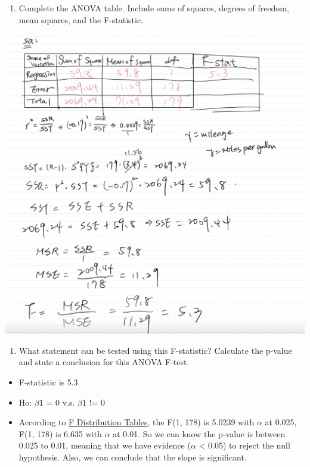 \documentclass[
]{article}
\providecommand{\tightlist}{%
  \setlength{\itemsep}{0pt}\setlength{\parskip}{0pt}}
\begin{document}
\begin{enumerate}
\def\labelenumi{(\alph{enumi})}
\tightlist
\item
  Complete the ANOVA table. Include sums of squares, degrees of freedom,
  mean squares, and the F-statistic.
\end{enumerate}

\includegraphics{pics/Screen Shot 2021-02-21 at 4.24.38 PM.png}

\begin{enumerate}
\def\labelenumi{(\alph{enumi})}
\setcounter{enumi}{1}
\tightlist
\item
  What statement can be tested using this F-statistic? Calculate the
  p-value and state a conclusion for this ANOVA F-test.
\end{enumerate}

\begin{itemize}
\tightlist
\item
  F-statistic is 5.3
\item
  Ho: \(\beta1\) = 0 v.s. \(\beta1\) != 0
\item
  According to \href{http://socr.ucla.edu/Applets.dir/F_Table.html}{F
  Distribution Tables}, the F(1, 178) is 5.0239 with \(\alpha\) at
  0.025, F(1, 178) is 6.635 with \(\alpha\) at 0.01. So we can know the
  p-value is between 0.025 to 0.01, meaning that we have evidence
  (\(\alpha\) \textless{} 0.05) to reject the null hypothesis. Also, we
  can conclude that the slope is significant.
\end{itemize}
\end{document}
